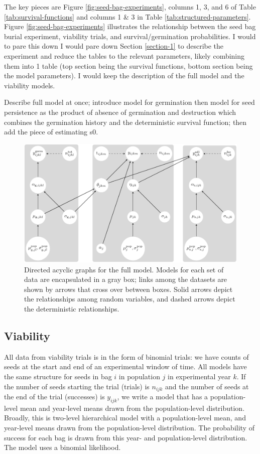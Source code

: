 \documentclass[12pt, oneside, titlepage]{article}   	%
\begin{document}
The key pieces are Figure \ref{fig:seed-bag-experiments}, columns 1, 3, and 6 of Table \ref{tab:survival-functions} and columns 1 \& 3 in Table \ref{tab:structured-parameters}. Figure \ref{fig:seed-bag-experiments} illustrates the relationship between the seed bag burial experiment, viability trials, and survival/germination probabilities. I would to pare this down I would pare down Section \ref{section-1} to describe the experiment and reduce the tables to the relevant parameters, likely combining them into 1 table (top section being the survival functions, bottom section being the model parameters). I would keep the description of the full model and the viability models. 


Describe full model at once; introduce model for germination then model for seed persistence as the product of absence of germination and destruction which combines the germination history and the deterministic survival function; then add the piece of estimating s0.

\begin{figure}[!h]
       \includegraphics[width=\textwidth]{../../manuscript/figures/dag-seed-bag.pdf}  
    \caption{ Directed acyclic graphs for the full model. Models for each set of data are encapsulated in a gray box; links among the datasets are shown by arrows that cross over between boxes. Solid arrows depict the relationships among random variables, and dashed arrows depict the deterministic relationships. }
 \label{fig:dag-seed-bag}
\end{figure}

\subsection{Viability}

All data from viability trials is in the form of binomial trials: we have counts of seeds at the start and end of an experimental window of time. All models have the same structure for seeds in bag $i$ in population $j$ in experimental year $k$. If the number of seeds starting the trial (trials) is $n_{ijk}$ and the number of seeds at the end of the trial (successes) is $y_{ijk}$, we write a model that has a population-level mean and year-level means drawn from the population-level distribution. Broadly, this is two-level hierarchical model with a population-level mean, and year-level means drawn from the population-level distribution. The probability of success for each bag is drawn from this year- and population-level distribution. The model uses a binomial likelihood. 
\end{document}
